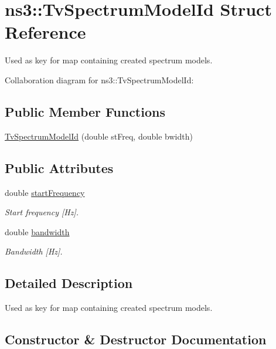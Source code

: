 \hypertarget{structns3_1_1TvSpectrumModelId}{}\section{ns3\+:\+:Tv\+Spectrum\+Model\+Id Struct Reference}
\label{structns3_1_1TvSpectrumModelId}


Used as key for map containing created spectrum models.  




Collaboration diagram for ns3\+:\+:Tv\+Spectrum\+Model\+Id\+:
\subsection*{Public Member Functions}
\begin{DoxyCompactItemize}
\item 
\hyperlink{structns3_1_1TvSpectrumModelId_a35590f4427e0ff274e4268c26622bfa0}{Tv\+Spectrum\+Model\+Id} (double st\+Freq, double bwidth)
\end{DoxyCompactItemize}
\subsection*{Public Attributes}
\begin{DoxyCompactItemize}
\item 
double \hyperlink{structns3_1_1TvSpectrumModelId_a87c5b77812d443722294fa9a95bd1bc6}{start\+Frequency}
\begin{DoxyCompactList}\small\item\em Start frequency \mbox{[}Hz\mbox{]}. \end{DoxyCompactList}\item 
double \hyperlink{structns3_1_1TvSpectrumModelId_ae7269ecaba03b728fe0b8b8977ae619a}{bandwidth}
\begin{DoxyCompactList}\small\item\em Bandwidth \mbox{[}Hz\mbox{]}. \end{DoxyCompactList}\end{DoxyCompactItemize}


\subsection{Detailed Description}
Used as key for map containing created spectrum models. 

\subsection{Constructor \& Destructor Documentation}
